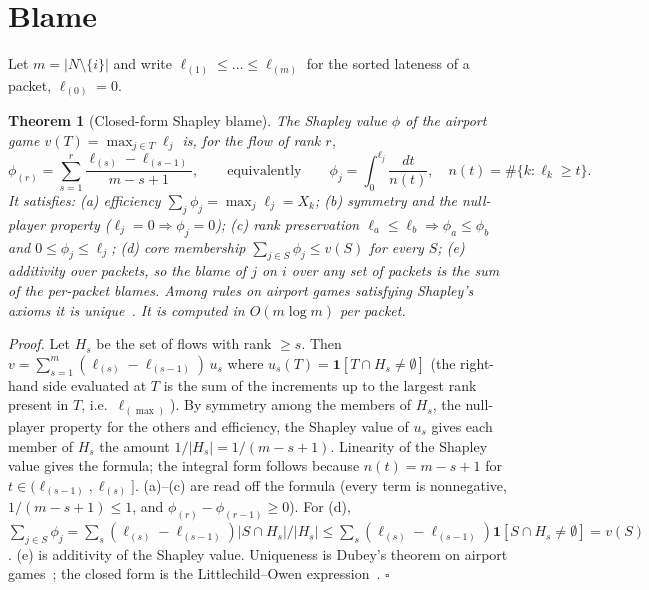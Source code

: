 \documentclass[11pt]{article}
\newtheorem{theorem}{Theorem}
\theoremstyle{definition}
\begin{document}
\section{Blame}
Let $m=|N\setminus\{i\}|$ and write $\ell_{(1)}\le\dots\le\ell_{(m)}$ for the sorted lateness of a packet, $\ell_{(0)}=0$.
\begin{theorem}[Closed-form Shapley blame]\label{thm:shapley}
The Shapley value $\phi$ of the airport game $v(T)=\max_{j\in T}\ell_j$ is, for the flow of rank $r$,
\[
\phi_{(r)}=\sum_{s=1}^{r}\frac{\ell_{(s)}-\ell_{(s-1)}}{m-s+1},\qquad\text{equivalently}\qquad \phi_j=\int_0^{\ell_j}\frac{dt}{n(t)},\quad n(t)=\#\{k:\ell_k\ge t\}.
\]
It satisfies: (a) efficiency $\sum_j\phi_j=\max_j\ell_j=X_k$; (b) symmetry and the null-player property ($\ell_j=0\Rightarrow\phi_j=0$); (c) rank preservation $\ell_a\le\ell_b\Rightarrow\phi_a\le\phi_b$ and $0\le\phi_j\le\ell_j$; (d) core membership $\sum_{j\in S}\phi_j\le v(S)$ for every $S$; (e) additivity over packets, so the blame of $j$ on $i$ over any set of packets is the sum of the per-packet blames. Among rules on airport games satisfying Shapley's axioms it is unique~\cite{dubey1982airport}. It is computed in $O(m\log m)$ per packet.
\end{theorem}
\emph{Proof.} Let $H_s$ be the set of flows with rank $\ge s$. Then $v=\sum_{s=1}^m(\ell_{(s)}-\ell_{(s-1)})\,u_s$ where $u_s(T)=\mathbf 1[T\cap H_s\ne\emptyset]$ (the right-hand side evaluated at $T$ is the sum of the increments up to the largest rank present in $T$, i.e.\ $\ell_{(\max)}$). By symmetry among the members of $H_s$, the null-player property for the others and efficiency, the Shapley value of $u_s$ gives each member of $H_s$ the amount $1/|H_s|=1/(m-s+1)$. Linearity of the Shapley value gives the formula; the integral form follows because $n(t)=m-s+1$ for $t\in(\ell_{(s-1)},\ell_{(s)}]$. (a)--(c) are read off the formula (every term is nonnegative, $1/(m-s+1)\le1$, and $\phi_{(r)}-\phi_{(r-1)}\ge0$). For (d), $\sum_{j\in S}\phi_j=\sum_s(\ell_{(s)}-\ell_{(s-1)})|S\cap H_s|/|H_s|\le\sum_s(\ell_{(s)}-\ell_{(s-1)})\mathbf 1[S\cap H_s\ne\emptyset]=v(S)$. (e) is additivity of the Shapley value. Uniqueness is Dubey's theorem on airport games~\cite{dubey1982airport}; the closed form is the Littlechild--Owen expression~\cite{littlechild1973airport}. \hfill$\square$
\end{document}
